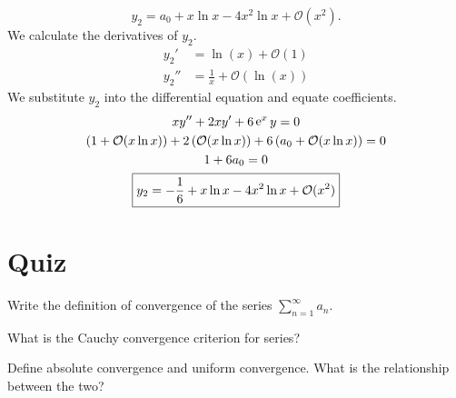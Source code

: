 {\begin{Solution}
  \[
  y_2 = a_0 + x \ln x - 4 x^2 \ln x + \mathcal{O}(x^2).
  \]
  We calculate the derivatives of $y_2$.
  \begin{align*}
    y_2' &= \ln(x) + \mathcal{O}(1) 
    \\
    y_2'' &= \frac{1}{x} + \mathcal{O}(\ln(x))
  \end{align*}
  We substitute $y_2$ into the differential equation and equate coefficients.
  \begin{gather*}
    x y'' + 2 x y' + 6 \mathop{\mathrm{e}}\nolimits^x y = 0
    \\
    \left( 1 + \mathcal{O}(x \ln x) \right)
    + 2 \left( \mathcal{O}(x \ln x) \right)
    + 6 \left( a_0 + \mathcal{O}(x \ln x) \right) = 0
    \\
    1 + 6 a_0 = 0
    \\
    \boxed{
      y_2 = - \frac{1}{6} + x \ln x - 4 x^2 \ln x + \mathcal{O}(x^2)
      }
  \end{gather*}
\end{Solution}







}


\raggedbottom
\pagebreak
\flushbottom
\section{Quiz}


\begin{QuizProblem}
  \label{quiz problem definition convergence series}
  Write the definition of convergence of the series $\sum_{n=1}^\infty a_n$.

\end{QuizProblem}


\begin{QuizProblem}
  \label{quiz problem Cauchy convergence series}
  What is the Cauchy convergence criterion for series?

\end{QuizProblem}


\begin{QuizProblem}
  \label{quiz problem absolute uniform convergence}
  Define absolute convergence and uniform convergence.  What is the 
  relationship between the two?

\end{QuizProblem}


